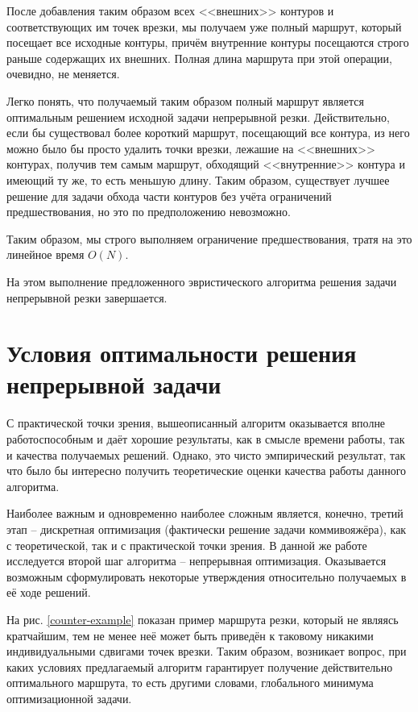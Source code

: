 \documentclass[10pt]{SPIIRAS_Proceedings}
\begin{document}
После добавления таким образом всех
<<внешних>> контуров
и соответствующих им точек врезки,
мы получаем уже полный маршрут,
который посещает все исходные контуры,
причём внутренние контуры посещаются
строго раньше содержащих их внешних.
Полная длина маршрута
при этой операции,
очевидно,
не меняется.

Легко понять,
что получаемый таким образом полный маршрут
является оптимальным решением исходной задачи
непрерывной резки.
Действительно,
если бы существовал более короткий маршрут,
посещающий все контура,
из него можно было бы просто удалить
точки врезки,
лежашие на
<<внешних>> контурах,
получив тем самым маршрут,
обходящий <<внутренние>> контура
и имеющий ту же,
то есть меньшую длину.
Таким образом, существует лучшее
решение для задачи обхода
части контуров без учёта
ограничений предшествования,
но это по предположению невозможно.

Таким образом,
мы строго выполняем
ограничение предшествования,
тратя на это линейное время
$O(N)$.

На этом выполнение
предложенного эвристического алгоритма
решения задачи непрерывной резки
завершается.

\section{Условия оптимальности решения непрерывной задачи}


С практической точки зрения,
вышеописанный алгоритм оказывается
вполне работоспособным
и даёт хорошие результаты,
как в смысле времени работы,
так и качества получаемых решений.
Однако,
это чисто эмпирический результат,
так что было бы интересно получить
теоретические оценки качества работы
данного алгоритма.

Наиболее важным и одновременно
наиболее сложным является,
конечно, третий этап --
дискретная оптимизация
(фактически решение задачи коммивояжёра),
как с теоретической,
так и с практической точки зрения.
В данной же работе исследуется
второй шаг алгоритма --
непрерывная оптимизация.
Оказывается возможным сформулировать
некоторые утверждения относительно
получаемых в её ходе решений.

  На рис. \ref{counter-example}
  показан пример маршрута резки,
  который не являясь кратчайшим,
  тем не менее неё
  может быть приведён к таковому
  никакими индивидуальными сдвигами
  точек врезки.
  Таким образом, возникает вопрос,
  при каких условиях предлагаемый алгоритм
  гарантирует получение действительно
  оптимального маршрута,
  то есть другими словами,
  глобального минимума оптимизационной задачи.
\end{document}
